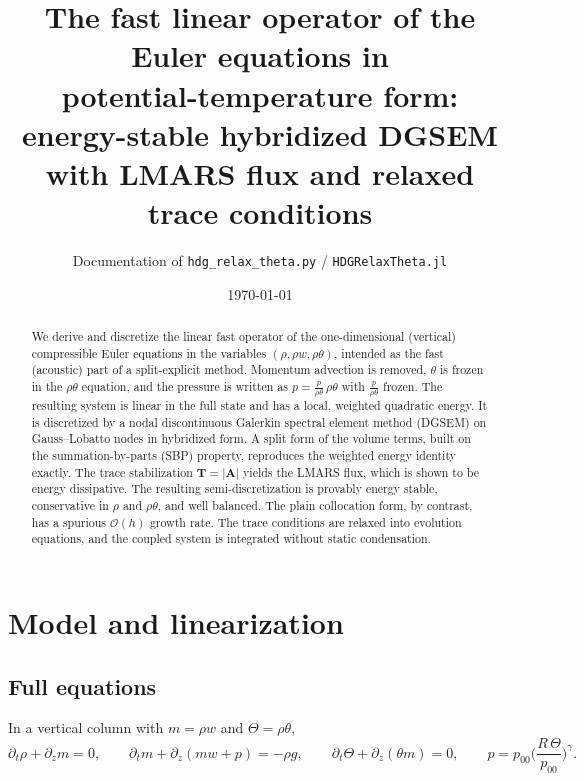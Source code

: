 \documentclass[11pt,a4paper]{article}
\title{The fast linear operator of the Euler equations in\\
potential-temperature form: energy-stable hybridized DGSEM\\
with LMARS flux and relaxed trace conditions}
\author{Documentation of \texttt{hdg\_relax\_theta.py} / \texttt{HDGRelaxTheta.jl}}
\date{\today}
\begin{document}
\maketitle

\begin{abstract}
We derive and discretize the linear fast operator of the one-dimensional (vertical)
compressible Euler equations in the variables $(\rho,\rho w,\rho\theta)$, intended as the fast
(acoustic) part of a split-explicit method. Momentum advection is removed, $\theta$ is frozen in
the $\rho\theta$ equation, and the pressure is written as $p=\frac{p}{\rho\theta}\,\rho\theta$
with $\frac{p}{\rho\theta}$ frozen. The resulting system is linear in the full state and has a
local, weighted quadratic energy. It is discretized by a nodal discontinuous Galerkin spectral
element method (DGSEM) on Gauss--Lobatto nodes in hybridized form. A split form of the volume
terms, built on the summation-by-parts (SBP) property, reproduces the weighted energy identity
exactly. The trace stabilization $\bm T=|\bm A|$ yields the LMARS flux, which is shown to be
energy dissipative. The resulting semi-discretization is provably energy stable, conservative in
$\rho$ and $\rho\theta$, and well balanced. The plain collocation form, by contrast, has a
spurious $\mathcal O(h)$ growth rate. The trace conditions are relaxed into evolution equations,
and the coupled system is integrated without static condensation.
\end{abstract}

\tableofcontents

\section{Model and linearization}
\subsection{Full equations}
In a vertical column with $m=\rho w$ and $\Theta=\rho\theta$,
\begin{equation}
\partial_t\rho + \partial_z m = 0,\qquad
\partial_t m + \partial_z(m w + p) = -\rho g,\qquad
\partial_t\Theta + \partial_z(\theta m) = 0,\qquad
p = p_{00}\Big(\frac{R\,\Theta}{p_{00}}\Big)^{\gamma}.
\end{equation}
\end{document}
